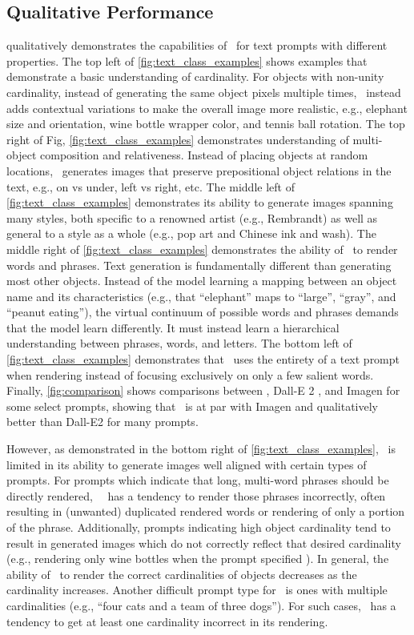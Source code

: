 \subsection{Qualitative Performance}

 qualitatively demonstrates the capabilities of \name~for text prompts with different properties. The top left of \cref{fig:text_class_examples} shows examples that demonstrate a basic understanding of cardinality. For objects with non-unity cardinality, instead of generating the same object pixels multiple times, \name~instead adds contextual variations to make the overall image more realistic, e.g., elephant size and orientation, wine bottle wrapper color, and tennis ball rotation. The top right of Fig, \ref{fig:text_class_examples} demonstrates understanding of multi-object composition and relativeness. Instead of placing objects at random locations, \name~generates images that preserve prepositional object relations in the text, e.g., on vs under, left vs right, etc. The middle left of \cref{fig:text_class_examples} demonstrates its ability to generate images spanning many styles, both specific to a renowned artist (e.g., Rembrandt) as well as general to a style as a whole (e.g., pop art and Chinese ink and wash). The middle right of \cref{fig:text_class_examples} demonstrates the ability of \name~to render words and phrases. Text generation is fundamentally different than generating most other objects. Instead of the model learning a mapping between an object name and its characteristics (e.g., that ``elephant'' maps to ``large'', ``gray'', and ``peanut eating''), the virtual continuum of possible words and phrases demands that the model learn differently. It must instead learn a hierarchical understanding between phrases, words, and letters. The bottom left of \cref{fig:text_class_examples} demonstrates that \name~uses the entirety of a text prompt when rendering instead of focusing exclusively on only a few salient words. Finally, \cref{fig:comparison} shows comparisons between \name, Dall-E 2 \citep{dalle2}, and Imagen \citep{imagen} for some select prompts, showing that \name~is at par with Imagen and qualitatively better than Dall-E2 for many prompts.

However, as demonstrated in the bottom right of \cref{fig:text_class_examples}, \name~is limited in its ability to generate images well aligned with certain types of prompts. For prompts which indicate that long, multi-word phrases should be directly rendered, ~\name~has a tendency to render those phrases incorrectly, often resulting in (unwanted) duplicated rendered words or rendering of only a portion of the phrase. Additionally, prompts indicating high object cardinality tend to result in generated images which do not correctly reflect that desired cardinality (e.g., rendering only  wine bottles when the prompt specified ). In general, the ability of \name~to render the correct cardinalities of objects decreases as the cardinality increases. Another difficult prompt type for \name~is ones with multiple cardinalities (e.g., ``four cats and a team of three dogs''). For such cases, \name~has a tendency to get at least one cardinality incorrect in its rendering.

